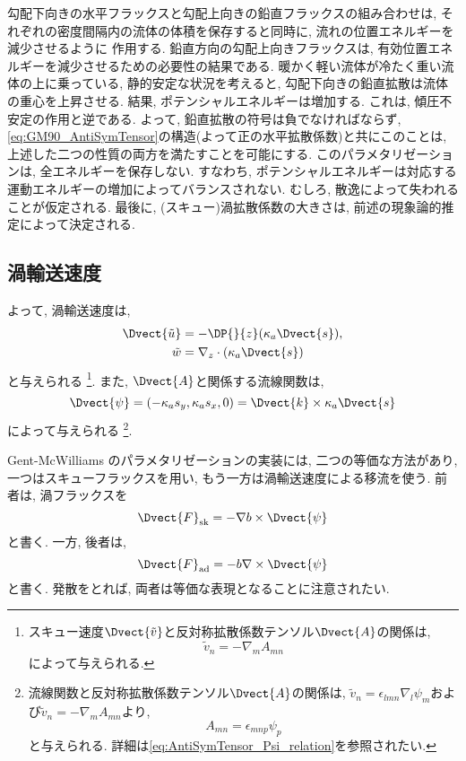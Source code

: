勾配下向きの水平フラックスと勾配上向きの鉛直フラックスの組み合わせは, 
それぞれの密度間隔内の流体の体積を保存すると同時に, 流れの位置エネルギーを減少させるように
作用する. 
鉛直方向の勾配上向きフラックスは, 有効位置エネルギーを減少させるための必要性の結果である. 
暖かく軽い流体が冷たく重い流体の上に乗っている, 静的安定な状況を考えると, 
勾配下向きの鉛直拡散は流体の重心を上昇させる. 結果, ポテンシャルエネルギーは増加する. 
これは, 傾圧不安定の作用と逆である. 
よって, 鉛直拡散の符号は負でなければならず, 
\eqref{eq:GM90_AntiSymTensor}の構造(よって正の水平拡散係数)と共にこのことは, 
上述した二つの性質の両方を満たすことを可能にする. 
このパラメタリゼーションは, 全エネルギーを保存しない. 
すなわち, ポテンシャルエネルギーは対応する運動エネルギーの増加によってバランスされない. 
むしろ, 散逸によって失われることが仮定される. 
最後に, (スキュー)渦拡散係数の大きさは, 前述の現象論的推定によって決定される.

\subsection*{渦輸送速度}
よって, 渦輸送速度は, 
\begin{equation}
 \begin{split}
   \Dvect{\tilde{u}} &= - \DP{}{z} (\kappa_a \Dvect{s}), \\
   \tilde{w} &= \nabla_z \cdot (\kappa_a \Dvect{s})
 \end{split}
\end{equation}
と与えられる%
\footnote{
スキュー速度$\Dvect{\tilde{v}}$と反対称拡散係数テンソル$\Dvect{A}$の関係は, 
\begin{equation*}
  \tilde{v}_n = - \nabla_m A_{mn}
\end{equation*}
によって与えられる. 
}. 
また, $\Dvect{A}$と関係する流線関数は, 
\begin{equation}
  \Dvect{\psi} = (-\kappa_a s_y, \kappa_a s_x, 0) = \Dvect{k} \times \kappa_a \Dvect{s}
\end{equation}
によって与えられる%
\footnote{
流線関数と反対称拡散係数テンソル$\Dvect{A}$の関係は, 
$\tilde{v}_n = \epsilon_{lmn}\nabla_l \psi_m$および$\tilde{v}_n = - \nabla_m A_{mn}$より, 
$$
A_{mn} = \epsilon_{mnp} \psi_p
$$
と与えられる. 詳細は\eqref{eq:AntiSymTensor_Psi_relation}を参照されたい. 
}. 

Gent-McWilliams のパラメタリゼーションの実装には, 二つの等価な方法があり, 
一つはスキューフラックスを用い, もう一方は渦輸送速度による移流を使う. 
前者は, 渦フラックスを
\begin{equation}
  \Dvect{F}_{\rm sk} = - \nabla b \times \Dvect{\psi}
\end{equation}
と書く. 
一方, 後者は, 
\begin{equation}
  \Dvect{F}_{\rm ad} = - b \nabla \times \Dvect{\psi}
\end{equation}
と書く. 
発散をとれば, 両者は等価な表現となることに注意されたい. 

